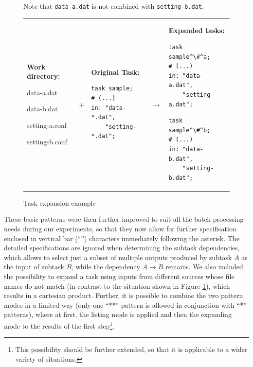 \documentclass[12pt,notitlepage]{report}
\begin{document}
\begin{figure}
\caption{Task expansion example}\label{fig:expansion}\footnotesize
\begin{center}
Note that \texttt{data-a.dat} is not combined with \texttt{setting-b.dat}.

\begin{tabular}{m{3cm} c m{4.1cm} c m{4.1cm}}
\textbf{Work directory:}\par data-a.dat \par data-b.dat \par setting-a.conf \par setting-b.conf &
+ & 
\textbf{Original Task:} \par \begin{lstlisting}
task sample;
# (...)
in: "data-*.dat", 
    "setting-*.dat";\end{lstlisting} &
$\rightarrow$ &
\textbf{Expanded tasks:} \par \begin{lstlisting}
task sample^\#^a;
# (...)
in: "data-a.dat", 
    "setting-a.dat";\end{lstlisting} \par \begin{lstlisting}
task sample^\#^b;
# (...)
in: "data-b.dat", 
    "setting-b.dat";\end{lstlisting}
\end{tabular}
\end{center}
\end{figure}

These basic patterns were then further improved to suit all the batch processing needs during our experiments, so that they now allow for further specification enclosed in vertical bar (``\textbar'') characters immediately following the asterisk. The detailed specifications are ignored when determining the subtask dependencies, which allows to select just a subset of multiple outputs produced by subtask $A$ as the input of subtask $B$, while the dependency $A\rightarrow B$ remains. We also included the possibility to expand a task using inputs from different sources whose file names do not match (in contrast to the situation shown in Figure \ref{fig:expansion}), which results in a cartesian product. Further, it is possible to combine the two pattern modes in a limited way (only one ``**''-pattern is allowed in conjunction with ``*''-patterns), where at first, the listing mode is applied and then the expanding mode to the results of the first step\footnote{This possibility should be further extended, so that it is applicable to a wider variety of situations.}.
\end{document}
